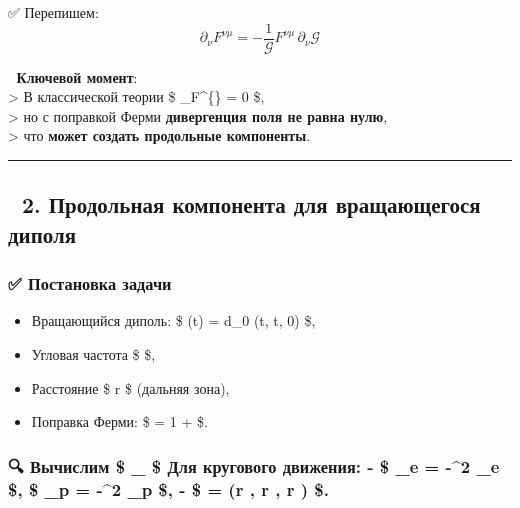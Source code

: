 \documentclass[11pt]{article}
\providecommand{\tightlist}{%
      \setlength{\itemsep}{0pt}\setlength{\parskip}{0pt}}
\begin{document}
✅ Перепишем: \[
\partial_\nu F^{\nu\mu} = -\frac{1}{\mathcal{G}} F^{\nu\mu} \, \partial_\nu \mathcal{G}
\]

📌 \textbf{Ключевой момент}:\\
\textgreater{} В классической теории \$ \partial\_\nu F\^{}\{\nu\mu\} =
0 \$,\\
\textgreater{} но с поправкой Ферми \textbf{дивергенция поля не равна
нулю},\\
\textgreater{} что \textbf{может создать продольные компоненты}.

\begin{center}\rule{0.5\linewidth}{\linethickness}\end{center}

\subsection{🔹 2. Продольная компонента для вращающегося
диполя}\label{ux43fux440ux43eux434ux43eux43bux44cux43dux430ux44f-ux43aux43eux43cux43fux43eux43dux435ux43dux442ux430-ux434ux43bux44f-ux432ux440ux430ux449ux430ux44eux449ux435ux433ux43eux441ux44f-ux434ux438ux43fux43eux43bux44f}

\subsubsection{✅ Постановка
задачи}\label{ux43fux43eux441ux442ux430ux43dux43eux432ux43aux430-ux437ux430ux434ux430ux447ux438-5}

\begin{itemize}
\tightlist
\item
  Вращающийся диполь: \$ (t) = d\_0 (\cos \omega t,
  \sin \omega t, 0) \$,
\item
  Угловая частота \$ \omega \$,
\item
  Расстояние \$ r \gg \lambda \$ (дальняя зона),
\item
  Поправка Ферми: \$  = 1 +
   \$.
\end{itemize}

\subsubsection{\texorpdfstring{🔍 Вычислим \$ \partial\_\nu {}
\$ Для кругового движения: - \$ \vec{\Gamma}\_e = -\omega\^{}2
\_e \$, \$ \vec{\Gamma}\_p = -\omega\^{}2 \_p \$, - \$
 = (r \sin \theta \cos \phi, r \sin \theta \sin \phi, r
\cos \theta)
\$.}{🔍 Вычислим \$ \_ \$ Для кругового движения: - \$ \_e = -\^{}2 \_e \$, \$ \_p = -\^{}2 \_p \$, - \$  = (r , r , r ) \$.}}\label{ux432ux44bux447ux438ux441ux43bux438ux43c-_-ux434ux43bux44f-ux43aux440ux443ux433ux43eux432ux43eux433ux43e-ux434ux432ux438ux436ux435ux43dux438ux44f---_e--2-_e-_p--2-_p---r-r-r-.}
\end{document}
